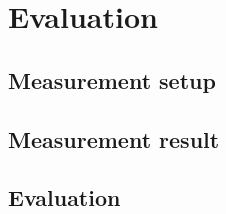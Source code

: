 
\chapter{Evaluation}


\section{Measurement setup}






\section{Measurement result}








\section{Evaluation}